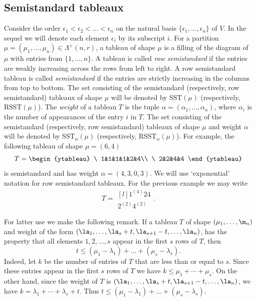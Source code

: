 \subsection{Semistandard tableaux}\label{s2.2}
	Consider the order $\epsilon_1 < \epsilon_2 <\dots< \epsilon_n$ on the natural basis $\{\epsilon_1,\dots,\epsilon_n\}$ of $V$. In the sequel we will denote each element $\epsilon_i$ by its subscript $i$. For a partition $\mu=(\mu_1,\dots,\mu_n) \in \Lambda^+(n,r)$, a tableau of shape $\mu$ is a filling of the diagram of $\mu$ with entries from $\{1,\dots,n\}$. A tableau is called \textit{row semistandard} if the entries are weakly increasing across the rows from left to right.  A row semistandard tableau is called \textit{semistandard} if the entries are strictly increasing in the columns from top to bottom. The set consisting of the semistandard (respectively, row semistandard) tableaux of shape $\mu$ will be denoted by $\mathrm{SST}(\mu)$ (respectively, $\mathrm{RSST}(\mu)$). The \textit{weight} of a tableau $T$ is the tuple $\alpha=(\alpha_1,\dots,\alpha_n)$, where $\alpha_i$ is the number of appearances of the entry $i$ in $T$. The set consisting of the semistandard (respectively, row semistandard) tableaux of shape $\mu$ and weight $\alpha$ will be denoted by $\mathrm{SST}_{\alpha}(\mu)$ (respectively, $\mathrm{RSST}_{\alpha}(\mu)$). For example, the following tableau of shape $\mu=(6,4)$
\[T= \begin{ytableau}
		\ 1&1&1&1&2&4\\
		\ 2&2&4&4 
	\end{ytableau} \]
is semistandard and has weight $\alpha=(4,3,0,3)$. We will use `exponential' notation for row semistandard tableaux. For the previous example we may write \[ T=\begin{matrix*}[l]
	1^{(4)} 2 4 \\
	2^{(2)}4^{(2)}  \end{matrix*}. \] 
\begin{rema}\label{obv}For latter use we make the following remark. If a tableau $T$ of shape $(\mu_1,\dots,\m_n)$ and weight of the form $(\la_1,\dots,\la_{s}+t, \la_{s+1}-t, \dots,\la_n)$, has the property that all elements $1,2,\dots,s$ appear in the first $s$ rows of $T$, then \[t \le (\mu_1 - \lambda_1)+\dots+(\mu_s - \lambda_s).\] Indeed, let $k$ be the number of entries of $T$ that are less than or equal to $s$. Since these entries appear in the first $s$ rows of $T$ we have $k \le \mu_1+\cdots +\mu_s.$ On the other hand, since the weight of $T$ is $(\la_1,\dots,\la_{s}+t, \la_{s+1}-t, \dots,\la_n)$, we have $k=\lambda_1+ \cdots +\lambda_s + t.$ Thus $t \le (\mu_1 - \lambda_1)+\dots+(\mu_s - \lambda_s)$.
\end{rema}
